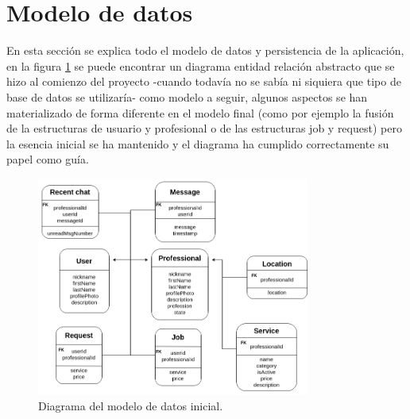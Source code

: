 \section{Modelo de datos}
\label{sec:modeloDatos}
En esta sección se explica todo el modelo de datos y persistencia de la aplicación, en la figura \ref{fig:er_inicial} se puede encontrar un diagrama entidad relación abstracto que se hizo al comienzo del proyecto -cuando todavía no se sabía ni siquiera que tipo de base de datos se utilizaría- como modelo a seguir, algunos aspectos se han materializado de forma diferente en el modelo final (como por ejemplo la fusión de la estructuras de usuario y profesional o de las estructuras job y request) pero la esencia inicial se ha mantenido y el diagrama ha cumplido correctamente su papel como guía.
\begin{figure}[h]
    \centering
    \includegraphics[width = 0.8\textwidth]{Imagenes/drawio/modelo_datos_inicial.png}
    \caption{Diagrama del modelo de datos inicial.}
    \label{fig:er_inicial}
\end{figure}
